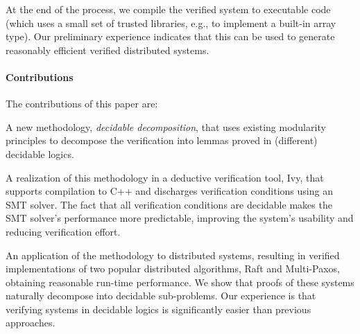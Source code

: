 At the end of
the process, we compile the verified system to executable code (which
uses a small set of trusted libraries, e.g., to implement a built-in
array type).
Our preliminary experience indicates that this can be used to generate reasonably efficient verified distributed systems.

\paragraph{Contributions}
The contributions of this paper are: %
\begin{compactenum}
\item A new methodology, \emph{decidable decomposition},
  that uses existing modularity principles to decompose the verification into lemmas proved in (different) decidable logics.
\item A realization of this methodology in a deductive verification tool, Ivy, that supports compilation to C++ and
  discharges verification conditions using an SMT solver. The fact that all verification conditions are decidable
  makes the SMT solver's performance more predictable, improving the system's usability and reducing verification effort.
\item An application of the methodology to distributed systems,
  resulting in verified implementations of two popular distributed algorithms, Raft and Multi-Paxos,
  obtaining reasonable run-time performance.
  We show that proofs of these systems naturally decompose into decidable sub-problems.
  Our experience is that verifying systems in decidable logics is significantly easier than previous approaches.
\end{compactenum}

